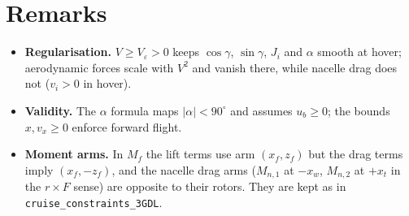 \documentclass[10pt,a4paper]{article}
\newcommand{\code}[1]{\texttt{\small #1}}
\begin{document}
\section{Remarks}

\begin{itemize}\setlength{\itemsep}{1pt}
\item \textbf{Regularisation.} $V \ge V_\varepsilon > 0$ keeps $\cos\gamma$, $\sin\gamma$, $J_i$ and $\alpha$ smooth at hover;
aerodynamic forces scale with $V^2$ and vanish there, while nacelle drag does not ($v_i > 0$ in hover).
\item \textbf{Validity.} The $\alpha$ formula maps $|\alpha|<90^\circ$ and assumes $u_b \ge 0$; the bounds $x, v_x \ge 0$ enforce forward flight.
\item \textbf{Moment arms.} In $M_f$ the lift terms use arm $(x_f, z_f)$ but the drag terms imply $(x_f, -z_f)$, and the
nacelle drag arms ($M_{n,1}$ at $-x_w$, $M_{n,2}$ at $+x_t$ in the $r\times F$ sense) are opposite to their rotors. They are kept as in
\code{cruise\_constraints\_3GDL}.
\end{itemize}
\end{document}
